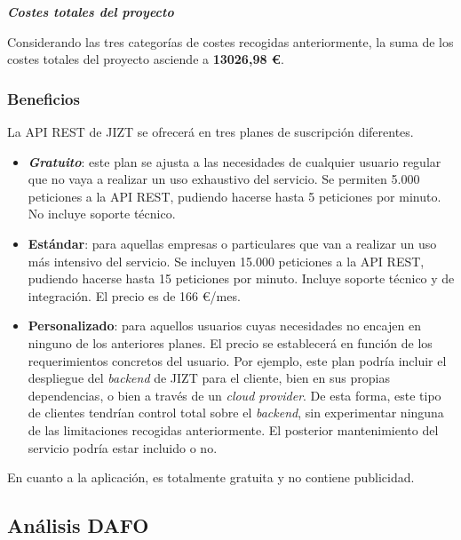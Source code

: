 \noindent
\textbf{\emph{Costes totales del proyecto}}

Considerando las tres categorías de costes recogidas anteriormente, la suma de los costes totales del proyecto asciende a \textbf{13026,98 €}.

\newpage

\subsubsection{Beneficios}

La API REST de JIZT se ofrecerá en tres planes de suscripción diferentes.

\vspace{-0.3cm}
\begin{itemize}[\textbullet]
	\item \textbf{\emph{Gratuito}}: este plan se ajusta a las necesidades de cualquier usuario regular que no vaya a realizar un uso exhaustivo del servicio. Se permiten 5.000 peticiones a la API REST, pudiendo hacerse hasta 5 peticiones por minuto. No incluye soporte técnico.
	
	\item \textbf{Estándar}: para aquellas empresas o particulares que van a realizar un uso más intensivo del servicio. Se incluyen 15.000 peticiones a la API REST, pudiendo hacerse hasta 15 peticiones por minuto. Incluye soporte técnico y de integración. El precio es de 166 €/mes.
	
	\item \textbf{Personalizado}: para aquellos usuarios cuyas necesidades no encajen en ninguno de los anteriores planes. El precio se establecerá en función de los requerimientos concretos del usuario. Por ejemplo, este plan podría incluir el despliegue del \emph{backend} de JIZT para el cliente, bien en sus propias dependencias, o bien a través de un \emph{cloud provider}. De esta forma, este tipo de clientes tendrían control total sobre el \emph{backend}, sin experimentar ninguna de las limitaciones recogidas anteriormente. El posterior mantenimiento del servicio podría estar incluido o no.
\end{itemize}

En cuanto a la aplicación, es totalmente gratuita y no contiene publicidad.

\newpage
\subsection{Análisis DAFO}

